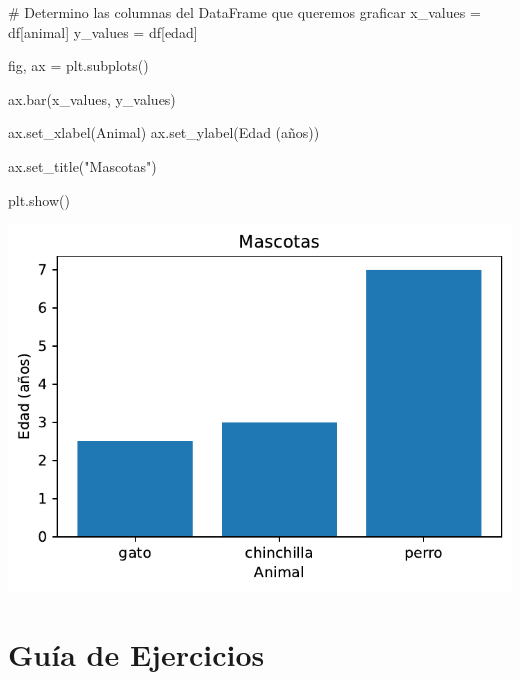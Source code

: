 \documentclass[
  letterpaper,
  DIV=11,
  numbers=noendperiod]{scrreprt}
\newenvironment{Shaded}{\begin{snugshade}}{\end{snugshade}}
\newcommand{\CommentTok}[1]{\textcolor[rgb]{0.37,0.37,0.37}{#1}}
\newcommand{\NormalTok}[1]{\textcolor[rgb]{0.00,0.23,0.31}{#1}}
\newcommand{\OperatorTok}[1]{\textcolor[rgb]{0.37,0.37,0.37}{#1}}
\newcommand{\StringTok}[1]{\textcolor[rgb]{0.13,0.47,0.30}{#1}}
\begin{document}
\begin{Shaded}
\begin{Highlighting}[]
\CommentTok{\# Determino las columnas del DataFrame que queremos graficar}
\NormalTok{x\_values }\OperatorTok{=}\NormalTok{ df[}\StringTok{\textquotesingle{}animal\textquotesingle{}}\NormalTok{]}
\NormalTok{y\_values }\OperatorTok{=}\NormalTok{ df[}\StringTok{\textquotesingle{}edad\textquotesingle{}}\NormalTok{]}

\NormalTok{fig, ax }\OperatorTok{=}\NormalTok{ plt.subplots()}

\NormalTok{ax.bar(x\_values, y\_values)}

\NormalTok{ax.set\_xlabel(}\StringTok{\textquotesingle{}Animal\textquotesingle{}}\NormalTok{)}
\NormalTok{ax.set\_ylabel(}\StringTok{\textquotesingle{}Edad (años)\textquotesingle{}}\NormalTok{)}

\NormalTok{ax.set\_title(}\StringTok{"Mascotas"}\NormalTok{)}

\NormalTok{plt.show()}
\end{Highlighting}
\end{Shaded}

\includegraphics{unidad_6_files/figure-pdf/cell-132-output-1.pdf}


\chapter*{Guía de Ejercicios}\label{guuxeda-de-ejercicios}

\end{document}
